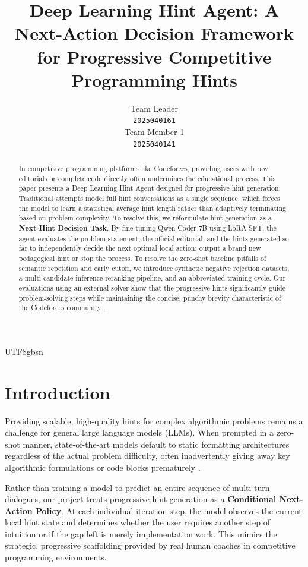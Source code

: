 \documentclass{article}
\title{Deep Learning Hint Agent: A Next-Action Decision Framework for Progressive Competitive Programming Hints}
\author{%
  Team Leader \\
  \texttt{2025040161} \\
  \And
  Team Member 1 \\
  \texttt{2025040141} \\
}
\begin{document}
\begin{CJK*}{UTF8}{gbsn}

\maketitle

\begin{abstract}
  In competitive programming platforms like Codeforces, providing users with raw editorials or complete code directly often undermines the educational process. This paper presents a Deep Learning Hint Agent designed for progressive hint generation. Traditional attempts model full hint conversations as a single sequence, which forces the model to learn a statistical average hint length rather than adaptively terminating based on problem complexity. To resolve this, we reformulate hint generation as a \textbf{Next-Hint Decision Task}. By fine-tuning Qwen-Coder-7B \cite{qwen2024} using LoRA SFT, the agent evaluates the problem statement, the official editorial, and the hints generated so far to independently decide the next optimal local action: output a brand new pedagogical hint or stop the process. To resolve the zero-shot baseline pitfalls of semantic repetition and early cutoff, we introduce synthetic negative rejection datasets, a multi-candidate inference reranking pipeline, and an abbreviated training cycle. Our evaluations using an external solver show that the progressive hints significantly guide problem-solving steps while maintaining the concise, punchy brevity characteristic of the Codeforces community \cite{codeforces2023}.
\end{abstract}

\section{Introduction}
Providing scalable, high-quality hints for complex algorithmic problems remains a challenge for general large language models (LLMs). When prompted in a zero-shot manner, state-of-the-art models default to static formatting architectures regardless of the actual problem difficulty, often inadvertently giving away key algorithmic formulations or code blocks prematurely \cite{codeforces2023}.

Rather than training a model to predict an entire sequence of multi-turn dialogues, our project treats progressive hint generation as a \textbf{Conditional Next-Action Policy}. At each individual iteration step, the model observes the current local hint state and determines whether the user requires another step of intuition or if the gap left is merely implementation work. This mimics the strategic, progressive scaffolding provided by real human coaches in competitive programming environments.


\end{CJK*}
\end{document}
